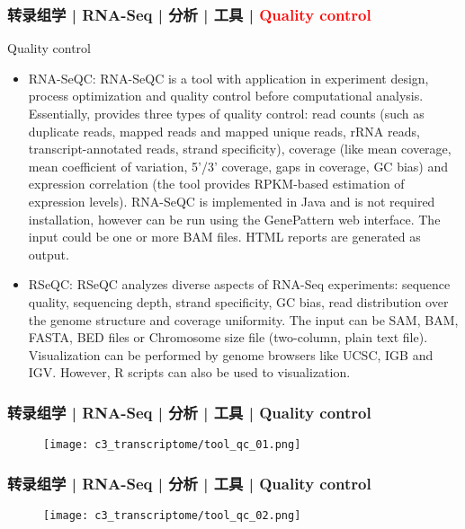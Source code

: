 \begin{frame}
  \frametitle{转录组学 | RNA-Seq | 分析 | 工具 | \textcolor{red}{Quality control}}
  {\footnotesize
  \begin{block}{Quality control}
    \begin{itemize}
      \item RNA-SeQC: RNA-SeQC is a tool with application in experiment design, process optimization and quality control before computational analysis. Essentially, provides three types of quality control: read counts (such as duplicate reads, mapped reads and mapped unique reads, rRNA reads, transcript-annotated reads, strand specificity), coverage (like mean coverage, mean coefficient of variation, 5'/3' coverage, gaps in coverage, GC bias) and expression correlation (the tool provides RPKM-based estimation of expression levels). RNA-SeQC is implemented in Java and is not required installation, however can be run using the GenePattern web interface. The input could be one or more BAM files. HTML reports are generated as output.
      \item RSeQC: RSeQC analyzes diverse aspects of RNA-Seq experiments: sequence quality, sequencing depth, strand specificity, GC bias, read distribution over the genome structure and coverage uniformity. The input can be SAM, BAM, FASTA, BED files or Chromosome size file (two-column, plain text file). Visualization can be performed by genome browsers like UCSC, IGB and IGV. However, R scripts can also be used to visualization.
    \end{itemize}
  \end{block}
  }
\end{frame}

\begin{frame}
  \frametitle{转录组学 | RNA-Seq | 分析 | 工具 | Quality control}
  \begin{figure}
    \centering
    \texttt{[image: c3\_transcriptome/tool\_qc\_01.png]}
  \end{figure}
\end{frame}

\begin{frame}
  \frametitle{转录组学 | RNA-Seq | 分析 | 工具 | Quality control}
  \begin{figure}
    \centering
    \texttt{[image: c3\_transcriptome/tool\_qc\_02.png]}
  \end{figure}
\end{frame}


